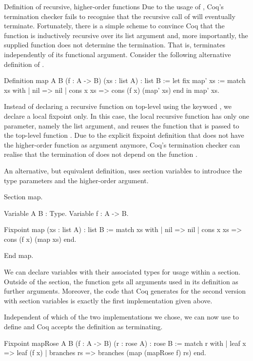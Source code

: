\begin{excursus}{Definition of recursive, higher\--order functions}
Due to the usage of , Coq's termination checker fails to recognise that the recursive call of  will eventually terminate.
Fortunately, there is a simple scheme to convince Coq that the function  is inductively recursive over its list argument and, more importantly, the supplied function does not determine the termination.
That is,  terminates independently of its functional argument.
Consider the following alternative definition of .

\begin{coqcode}
Definition map A B (f : A -> B) (xs : list A) : list B :=
 let fix map' xs :=
     match xs with
     | nil       => nil
     | cons x xs => cons (f x) (map' xs)
     end
 in map' xs.
\end{coqcode}

Instead of declaring a recursive function on top\--level using the keyword , we declare a local fixpoint only.
In this case, the local recursive function  has only one parameter, namely the list argument, and reuses the function  that is passed to the top\--level function .
Due to the explicit fixpoint definition that does not have the higher\--order function as argument anymore, Coq's termination checker can realise that the termination of  does not depend on the function .

An alternative, but equivalent definition, uses section variables to introduce the type parameters and the higher\--order argument.

\begin{coqcode}
Section map.

 Variable A B : Type.
 Variable f : A -> B.

 Fixpoint map (xs : list A) : list B :=
   match xs with
   | nil       => nil
   | cons x xs => cons (f x) (map xs)
   end.

End map.
\end{coqcode}

We can declare variables with their associated types for usage within a section.
Outside of the section, the function  gets all arguments used in its definition as further arguments.
Moreover, the code that Coq generates for the second version with section variables is exactly the first implementation given above.

Independent of which of the two implementations we chose, we can now use  to define  and Coq accepts the definition as terminating.

\begin{coqcode}
Fixpoint mapRose A B (f : A -> B) (r : rose A) : rose B :=
 match r with
 | leaf x      => leaf (f x)
 | branches rs => branches (map (mapRose f) rs)
 end.
\end{coqcode}
\end{excursus}

